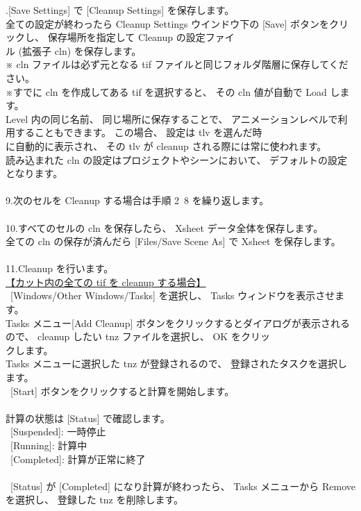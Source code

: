 \documentclass[a4paper,10pt]{article}
\begin{document}
.[Save Settings] で [Cleanup Settings] を保存します。\\
\footnotesize
全ての設定が終わったら Cleanup Settings ウインドウ下の [Save] ボタンをクリックし、 保存場所を指定して Cleanup の設定ファイ\\
ル (拡張子 cln) を保存します。\\
※ cln ファイルは必ず元となる tif ファイルと同じフォルダ階層に保存してください。\\
※すでに cln を作成してある tif を選択すると、 その cln 値が自動で Load します。\\
Level 内の同じ名前、 同じ場所に保存することで、 アニメーションレベルで利用することもできます。 この場合、 設定は tlv を選んだ時\\
に自動的に表示され、 その tlv が cleanup される際には常に使われます。\\
読み込まれた cln の設定はプロジェクトやシーンにおいて、 デフォルトの設定となります。\\
\\
\small
9.次のセルを Cleanup する場合は手順 2~8 を繰り返します。\\
\\
10.すべてのセルの cln を保存したら、 Xsheet データ全体を保存します。\\
\footnotesize
全ての cln の保存が済んだら [Files/Save Scene As] で Xsheet を保存します。\\
\\
\small
11.Cleanup を行います。\\
\footnotesize
\uline{【カット内の全ての tif を cleanup する場合】}\\
\ [Windows/Other Windows/Tasks] を選択し、 Tasks ウィンドウを表示させます。\\
Tasks メニュー[Add Cleanup] ボタンをクリックするとダイアログが表示されるので、 cleanup したい tnz ファイルを選択し、 OK をクリッ\\
クします。\\
Tasks メニューに選択した tnz が登録されるので、 登録されたタスクを選択します。\\
\ [Start] ボタンをクリックすると計算を開始します。\\
\\
計算の状態は [Status] で確認します。\\
\ [Suspended]: 一時停止\\
\ [Running]: 計算中\\
\ [Completed]: 計算が正常に終了\\
\\
\ [Status] が [Completed] になり計算が終わったら、 Tasks メニューから Remove を選択し、 登録した tnz を削除します。\\
\end{document}
